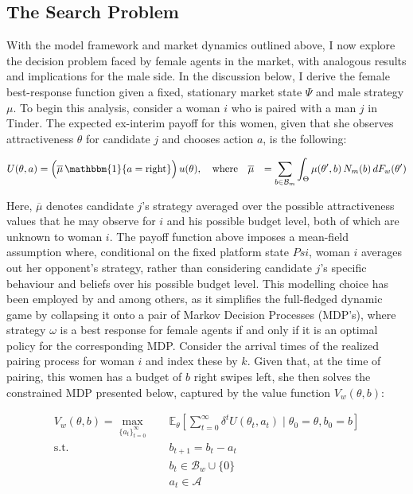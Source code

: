 \subsection{The Search Problem}\label{sec:section2.3}
With the model framework and market dynamics outlined above, I now explore the decision problem faced by female agents in the market, with analogous results and implications for the male side. In the discussion below, I derive the female best-response function given a fixed, stationary market state $\Psi$ and male strategy $\mu$. To begin this analysis, consider a woman $i$ who is paired with a man $j$ in Tinder. The expected ex-interim payoff for this women, given that she observes attractiveness $\theta$ for candidate $j$ and chooses action $a$, is the following:

\begin{equation*}
    \begin{aligned}
        U(\theta, a)&=\Big(\overline{\mu}\,\mathbbm{1}\{a=\text{right}\}\Big)\,u(\theta), \quad \text{where}\quad \overline{\mu} &= \sum_{b\in \mathcal{B}_m}\int_{\Theta} \mu(\theta',b)\,{N}_m(b)\,dF_w(\theta')
    \end{aligned} 
\end{equation*}

Here, $\overline\mu$ denotes candidate $j$'s strategy averaged over the possible attractiveness values that he may observe for $i$ and his possible budget level, both of which are unknown to woman $i$. The payoff function above imposes a mean-field assumption where, conditional on the fixed platform state $Psi$, woman $i$ averages out her opponent's strategy, rather than considering candidate $j$'s specific behaviour and beliefs over his possible budget level. This modelling choice has been employed by \cite{immorlica2021designing} and \cite{iyer2014mean} among others, as it simplifies the full-fledged dynamic game by collapsing it onto a pair of Markov Decision Processes (MDP's), where strategy $\omega$ is a best response for female agents if and only if it is an optimal policy for the corresponding MDP. Consider the arrival times of the realized pairing process for woman $i$ and index these by $k$. Given that, at the time of pairing, this women has a budget of $b$ right swipes left, she then solves the constrained MDP presented below, captured by the value function $V_w(\theta,b)$:

\begin{equation*}
    \begin{aligned} 
        V_w(\theta,b)=\max_{\{a_t\}^\infty_{t=0}} \quad & \mathbb{E}_{\theta}\left[\sum^\infty_{t=0} \delta^{t} U(\theta_t, a_t) \;|\; \theta_0=\theta, b_0=b\right]\\ 
        \textrm{s.t.} \quad & b_{t+1} = b_t -a_t \\
        & b_t\in \mathcal{B}_w \cup \{0\} \\
        & a_t\in \mathcal{A}  
    \end{aligned}
\end{equation*}

